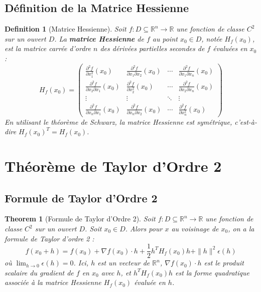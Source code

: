 \documentclass{article}
\newtheorem{theorem}{Theorem}
\newtheorem{definition}{Definition}
\begin{document}
\subsection{Définition de la Matrice Hessienne}

\begin{definition}[Matrice Hessienne]
Soit $f: D \subseteq \mathbb{R}^n \rightarrow \mathbb{R}$ une fonction de classe $C^2$ sur un ouvert $D$. La \textbf{matrice Hessienne} de $f$ au point $x_0 \in D$, notée $H_f(x_0)$, est la matrice carrée d'ordre $n$ des dérivées partielles secondes de $f$ évaluées en $x_0$ :
\[ H_f(x_0) = \begin{pmatrix}
    \frac{\partial^2 f}{\partial x_1^2}(x_0) & \frac{\partial^2 f}{\partial x_1 \partial x_2}(x_0) & \cdots & \frac{\partial^2 f}{\partial x_1 \partial x_n}(x_0) \\
    \frac{\partial^2 f}{\partial x_2 \partial x_1}(x_0) & \frac{\partial^2 f}{\partial x_2^2}(x_0) & \cdots & \frac{\partial^2 f}{\partial x_2 \partial x_n}(x_0) \\
    \vdots & \vdots & \ddots & \vdots \\
    \frac{\partial^2 f}{\partial x_n \partial x_1}(x_0) & \frac{\partial^2 f}{\partial x_n \partial x_2}(x_0) & \cdots & \frac{\partial^2 f}{\partial x_n^2}(x_0)
\end{pmatrix} \]
En utilisant le théorème de Schwarz, la matrice Hessienne est symétrique, c'est-à-dire $H_f(x_0)^T = H_f(x_0)$.
\end{definition}

\section{Théorème de Taylor d'Ordre 2}

\subsection{Formule de Taylor d'Ordre 2}

\begin{theorem}[Formule de Taylor d'Ordre 2]
Soit $f: D \subseteq \mathbb{R}^n \rightarrow \mathbb{R}$ une fonction de classe $C^2$ sur un ouvert $D$. Soit $x_0 \in D$. Alors pour $x$ au voisinage de $x_0$, on a la formule de Taylor d'ordre 2 :
\[ f(x_0 + h) = f(x_0) + \nabla f(x_0) \cdot h + \frac{1}{2} h^T H_f(x_0) h + \|h\|^2 \epsilon(h) \]
où $\lim_{h \to 0} \epsilon(h) = 0$. Ici, $h$ est un vecteur de $\mathbb{R}^n$, $\nabla f(x_0) \cdot h$ est le produit scalaire du gradient de $f$ en $x_0$ avec $h$, et $h^T H_f(x_0) h$ est la forme quadratique associée à la matrice Hessienne $H_f(x_0)$ évaluée en $h$.
\end{theorem}
\end{document}
